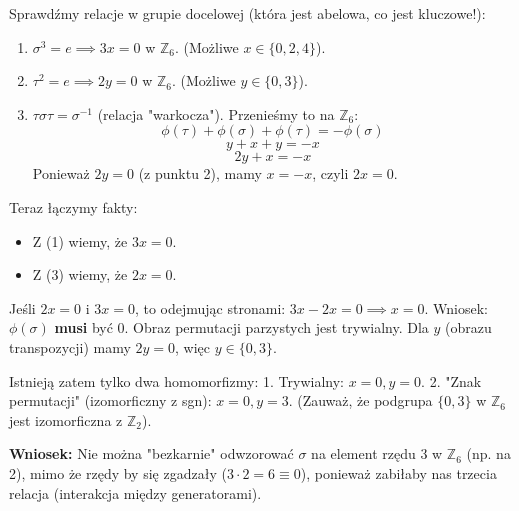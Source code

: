 Sprawdźmy relacje w grupie docelowej (która jest abelowa, co jest kluczowe!):
\begin{enumerate}
    \item $\sigma^3 = e \implies 3x = 0$ w $\mathbb{Z}_6$. (Możliwe $x \in \{0, 2, 4\}$).
    \item $\tau^2 = e \implies 2y = 0$ w $\mathbb{Z}_6$. (Możliwe $y \in \{0, 3\}$).
    \item $\tau\sigma\tau = \sigma^{-1}$ (relacja "warkocza").
    Przenieśmy to na $\mathbb{Z}_6$:
    \[ \phi(\tau) + \phi(\sigma) + \phi(\tau) = -\phi(\sigma) \]
    \[ y + x + y = -x \]
    \[ 2y + x = -x \]
    Ponieważ $2y = 0$ (z punktu 2), mamy $x = -x$, czyli $2x = 0$.
\end{enumerate}

Teraz łączymy fakty:
\begin{itemize}
    \item Z (1) wiemy, że $3x = 0$.
    \item Z (3) wiemy, że $2x = 0$.
\end{itemize}
Jeśli $2x=0$ i $3x=0$, to odejmując stronami: $3x - 2x = 0 \implies x = 0$.
Wniosek: $\phi(\sigma)$ \textbf{musi} być $0$. Obraz permutacji parzystych jest trywialny.
Dla $y$ (obrazu transpozycji) mamy $2y=0$, więc $y \in \{0, 3\}$.

Istnieją zatem tylko dwa homomorfizmy:
1. Trywialny: $x=0, y=0$.
2. "Znak permutacji" (izomorficzny z sgn): $x=0, y=3$. (Zauważ, że podgrupa $\{0, 3\}$ w $\mathbb{Z}_6$ jest izomorficzna z $\mathbb{Z}_2$).

\textbf{Wniosek:} Nie można "bezkarnie" odwzorować $\sigma$ na element rzędu 3 w $\mathbb{Z}_6$ (np. na 2), mimo że rzędy by się zgadzały ($3 \cdot 2 = 6 \equiv 0$), ponieważ zabiłaby nas trzecia relacja (interakcja między generatorami).
